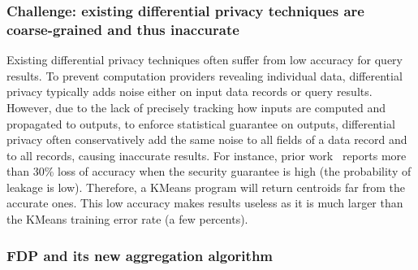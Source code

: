 \vspace{-.15in}
\subsubsection{Challenge: existing differential privacy techniques are 
coarse-grained and thus inaccurate} 
\label{sec:ift-problem}\vspace{-.075in}

Existing differential privacy techniques often suffer from low accuracy for 
query results. To prevent computation providers revealing individual 
data, differential privacy typically adds noise either on input data 
records or query results. However, due to the lack of precisely tracking 
how inputs are computed and propagated to outputs, to enforce statistical 
guarantee on outputs, differential privacy often conservatively add the same 
noise to all fields of a data record and to all records, causing inaccurate 
results. For instance, prior work~\cite{differentialresult:vldb15} reports 
more than 30\% loss of accuracy when the security guarantee is high (the 
probability of leakage is low). Therefore, a KMeans program will return 
centroids far from the accurate ones. This low accuracy makes results useless as 
it is much larger than the KMeans training error rate (a few percents).

\vspace{-.15in}
\subsubsection{FDP and its new aggregation algorithm} 
\label{sec:ift-problem}\vspace{-.075in}

